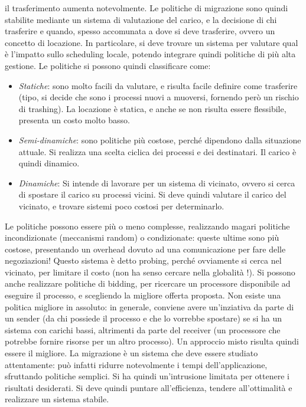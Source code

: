 il trasferimento aumenta notevolmente.
Le politiche di migrazione sono quindi stabilite mediante un sistema di valutazione del carico, e la decisione di chi
trasferire e quando, spesso accomunata a dove si deve trasferire, ovvero un concetto di locazione. In particolare, si 
deve trovare un sistema per valutare qual è l'impatto sullo scheduling locale, potendo integrare quindi politiche di più 
alta gestione. Le politiche si possono quindi classificare come:
\begin{itemize}
 \item \textit{Statiche}: sono molto facili da valutare, e risulta facile definire come trasferire (tipo, si decide che 
 sono i processi nuovi a muoversi, fornendo però un rischio di trashing). La locazione è statica, e anche se non 
 risulta essere flessibile, presenta un costo molto basso.
 \item \textit{Semi-dinamiche}: sono politiche più costose, perché dipendono dalla situazione attuale. Si realizza una 
 scelta ciclica dei processi e dei destinatari. Il carico è quindi dinamico.
 \item \textit{Dinamiche}: Si intende di lavorare per un sistema di vicinato, ovvero si cerca di spostare il carico su 
 processi vicini. Si deve quindi valutare il carico del vicinato, e trovare sistemi poco costosi per determinarlo.
\end{itemize}
Le politiche possono essere più o meno complesse, realizzando magari politiche incondizionate (meccanismi random) o 
condizionate: queste ultime sono più costose, presentando un overhead dovuto ad una comunicazione per fare delle 
negoziazioni! Questo sistema è detto probing, perché ovviamente si cerca nel vicinato, per limitare il costo (non ha 
senso cercare nella globalità !). Si possono anche realizzare politiche di bidding, per ricercare un processore 
disponibile ad eseguire il processo, e scegliendo la migliore offerta proposta.
Non esiste una politica migliore in assoluto: in generale, conviene avere un'inziativa da parte di un sender (da chi 
possiede il processo e che lo vorrebbe spostare) se si ha un sistema con carichi bassi, altrimenti da parte del receiver
(un processore che potrebbe fornire risorse per un altro processo). Un approccio misto risulta quindi essere il 
migliore.
La migrazione è un sistema che deve essere studiato attentamente: può infatti ridurre notevolmente i tempi 
dell'applicazione, sfruttando politiche semplici. Si ha quindi un'intrusione limitata per ottenere i risultati 
desiderati. Si deve quindi puntare all'efficienza, tendere all'ottimalità e realizzare un sistema stabile.
